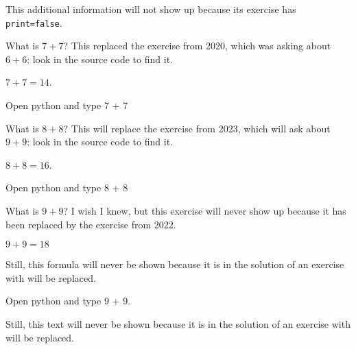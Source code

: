 \documentclass{book}
\begin{document}
\begin{additionalinformation}
This additional information will not show up because its exercise has \texttt{print=false}.
\end{additionalinformation}

\begin{exercise}[examdate={January 16, 2021}, examproblemnumber={1}, examproblemid={2021-01-16-01}]
  What is \(7 + 7\)? This replaced the exercise from 2020, which was asking about \(6 + 6\): look in the source code to find it.
\end{exercise}

\begin{solution}
  \(7 + 7 = 14\).
\end{solution}

\begin{additionalinformation}
Open python and type 7 + 7
\end{additionalinformation}

\begin{exercise}[examdate={January 16, 2022}, examproblemnumber={1}, examproblemid={2022-01-16-01}]
  What is \(8 + 8\)? This will replace the exercise from 2023, which will ask about \(9 + 9\): look in the source code to find it.
\end{exercise}

\begin{solution}
  \(8 + 8 = 16\).
\end{solution}

\begin{additionalinformation}
Open python and type 8 + 8
\end{additionalinformation}

\begin{exercise}[examdate={January 16, 2023}, examproblemnumber={1}, examproblemid={2023-01-16-01}, replacedbyexamproblemid={2022-01-16-01}, replacementsinceacademicyear={2025/2026}]
  What is \(9 + 9\)? I wish I knew, but this exercise will never show up because it has been replaced by the exercise from 2022.
\end{exercise}

\begin{solution}
  \(9 + 9 = 18\)

Still, this formula will never be shown because it is in the solution of an exercise with will be replaced.
\end{solution}

\begin{additionalinformation}
Open python and type 9 + 9.

Still, this text will never be shown because it is in the solution of an exercise with will be replaced.
\end{additionalinformation}
\end{document}
